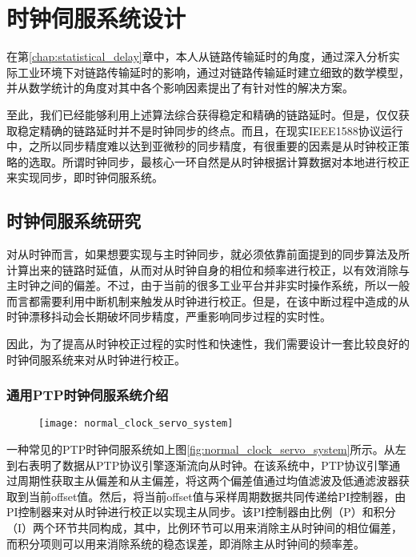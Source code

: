 
\chapter{时钟伺服系统设计}
在第\ref{chap:statistical_delay}章中，本人从链路传输延时的角度，通过深入分析实际工业环境下对链路传输延时的影响，通过对链路传输延时建立细致的数学模型，并从数学统计的角度对其中各个影响因素提出了有针对性的解决方案。

至此，我们已经能够利用上述算法综合获得稳定和精确的链路延时。但是，仅仅获取稳定精确的链路延时并不是时钟同步的终点。而且，在现实IEEE1588协议运行中，之所以同步精度难以达到亚微秒的同步精度，有很重要的因素是从时钟校正策略的选取。所谓时钟同步，最核心一环自然是从时钟根据计算数据对本地进行校正来实现同步，即时钟伺服系统。

\section{时钟伺服系统研究}
对从时钟而言，如果想要实现与主时钟同步，就必须依靠前面提到的同步算法及所计算出来的链路时延值，从而对从时钟自身的相位和频率进行校正，以有效消除与主时钟之间的偏差。不过，由于当前的很多工业平台并非实时操作系统，所以一般而言都需要利用中断机制来触发从时钟进行校正。但是，在该中断过程中造成的从时钟漂移抖动会长期破坏同步精度，严重影响同步过程的实时性。

因此，为了提高从时钟校正过程的实时性和快速性，我们需要设计一套比较良好的时钟伺服系统来对从时钟进行校正。

\subsection{通用PTP时钟伺服系统介绍}

\begin{figure}[!hbp]
  \centering
  \begin{minipage}[b]{0.7\textwidth}
    \captionstyle{\centering}
    \centering
    \texttt{[image: normal\_clock\_servo\_system]}
  \end{minipage}     
\end{figure}

一种常见的PTP时钟伺服系统如上图\ref{fig:normal_clock_servo_system}所示。从左到右表明了数据从PTP协议引擎逐渐流向从时钟。在该系统中，PTP协议引擎通过周期性获取主从偏差和从主偏差，将这两个偏差值通过均值滤波及低通滤波器获取到当前offset值。然后，将当前offset值与采样周期数据共同传递给PI控制器，由PI控制器来对从时钟进行校正以实现主从同步。该PI控制器由比例（P）和积分（I）两个环节共同构成，其中，比例环节可以用来消除主从时钟间的相位偏差，而积分项则可以用来消除系统的稳态误差，即消除主从时钟间的频率差。


